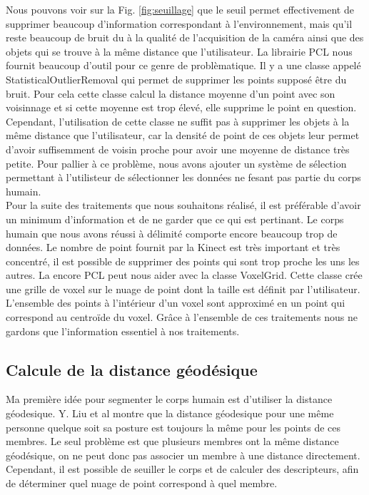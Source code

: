 Nous pouvons voir sur la Fig. \ref{fig:seuillage} que le seuil permet effectivement de supprimer beaucoup d'information
correspondant à l'environnement, mais qu'il reste beaucoup de bruit du à la qualité de l'acquisition de la caméra ainsi que 
des objets qui se trouve à la même distance que l'utilisateur. La librairie
PCL\cite{PCL} nous fournit beaucoup d'outil pour ce genre de problèmatique. Il y a une classe appelé StatisticalOutlierRemoval
qui permet de supprimer les points supposé être du bruit. Pour cela cette classe calcul la distance moyenne d'un point avec son
voisinnage et si cette moyenne est trop élevé, elle supprime le point en question. Cependant, l'utilisation de cette classe ne
suffit pas à supprimer les objets à la même distance que l'utilisateur, car la densité de point de ces objets leur permet d'avoir
suffisemment de voisin proche pour avoir une moyenne de distance très petite. Pour pallier à ce problème, nous avons ajouter un
système de sélection permettant à l'utilisteur de sélectionner les données ne fesant pas partie du corps humain.\\


Pour la suite des traitements que nous souhaitons réalisé, il est préférable d'avoir un minimum d'information et de ne garder
que ce qui est pertinant. Le corps humain que nous avons réussi à délimité comporte encore beaucoup trop de données. Le nombre
de point fournit par la Kinect est très important et très concentré, il est possible de supprimer des points qui sont trop 
proche les uns les autres. La encore PCL\cite{PCL} peut nous aider avec la classe VoxelGrid. Cette classe crée une grille de
voxel sur le nuage de point dont la taille est définit par l'utilisateur. L'ensemble des points à l'intérieur d'un voxel sont 
approximé en un point qui correspond au centroïde du voxel. Grâce à l'ensemble de ces traitements nous ne gardons que l'information 
essentiel à nos traitements.

\subsection{Calcule de la distance géodésique}
Ma première idée pour segmenter le corps humain est d'utiliser la distance géodesique. Y. Liu et al\cite{GIF} montre que la distance
géodesique pour une même personne quelque soit sa posture est toujours la même pour les points de ces membres. Le seul problème 
est que plusieurs membres ont la même distance géodésique, on ne peut donc pas associer un membre à une distance directement.
Cependant, il est possible de seuiller le corps et de calculer des descripteurs, afin de déterminer quel nuage de point
correspond à quel membre.\\

